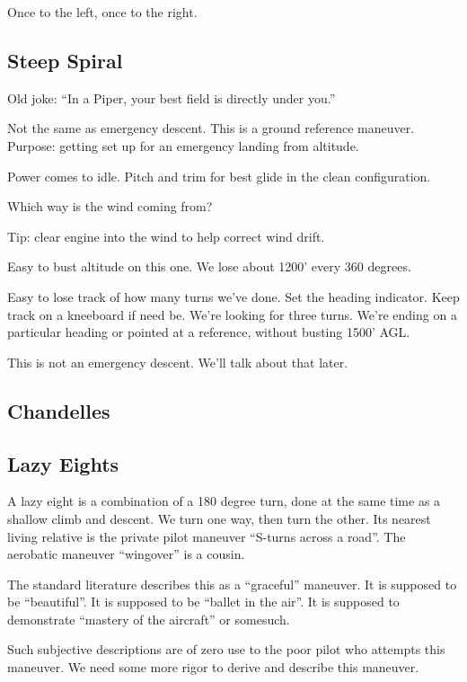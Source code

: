 Once to the left, once to the right.

\subsection{Steep Spiral}

Old joke: ``In a Piper, your best field is directly under you.''

Not the same as emergency descent. This is a ground reference maneuver. Purpose: getting set up for an emergency landing from altitude.

Power comes to idle. Pitch and trim for best glide in the clean configuration.

Which way is the wind coming from?

Tip: clear engine into the wind to help correct wind drift.

Easy to bust altitude on this one. We lose about 1200' every 360 degrees.

Easy to lose track of how many turns we've done. Set the heading indicator. Keep track on a kneeboard if need be. We're looking for three turns. We're ending on a particular heading or pointed at a reference, without busting 1500' AGL.

This is not an emergency descent. We'll talk about that later.

\subsection{Chandelles}

\subsection{Lazy Eights}

A lazy eight is a combination of a 180 degree turn, done at the same time as a shallow climb and descent. We turn one way, then turn the other. Its nearest living relative is the private pilot maneuver ``S-turns across a road''. The aerobatic maneuver ``wingover'' is a cousin.

The standard literature describes this as a ``graceful'' maneuver. It is supposed to be ``beautiful''. It is supposed to be ``ballet in the air''. It is supposed to demonstrate ``mastery of the aircraft'' or somesuch.

Such subjective descriptions are of zero use to the poor pilot who attempts this maneuver. We need some more rigor to derive and describe this maneuver.

